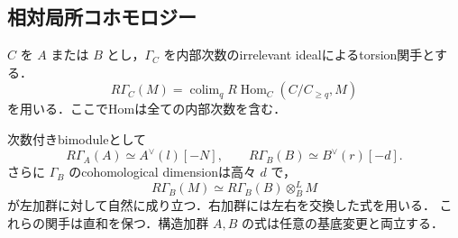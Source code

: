 \subsection{相対局所コホモロジー}
$C$ を $A$ または $B$ とし，$\Gamma_C$ を内部次数のirrelevant idealによるtorsion関手とする．
\[
 R\Gamma_C(M)=\mathop{\mathrm{colim}}_q
       R\!\operatorname{Hom}_C(C/C_{\ge q},M)
\]
を用いる．ここでHomは全ての内部次数を含む．

\begin{theorem}\label{thm:finite-relative-local-cohomology}
次数付きbimoduleとして
\[
 R\Gamma_A(A)\simeq A^\vee(l)[-N],\qquad
 R\Gamma_B(B)\simeq B^\vee(r)[-d].
\]
さらに $\Gamma_B$ のcohomological dimensionは高々 $d$ で，
\[
 R\Gamma_B(M)\simeq R\Gamma_B(B)\otimes_B^L M
\]
が左加群に対して自然に成り立つ．右加群には左右を交換した式を用いる．
これらの関手は直和を保つ．構造加群 $A,B$ の式は任意の基底変更と両立する．
\end{theorem}
